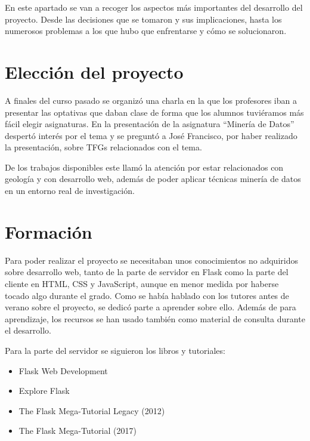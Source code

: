 
En este apartado se van a recoger los aspectos más importantes del desarrollo
del proyecto. Desde las decisiones que se tomaron y sus implicaciones,
hasta los numerosos problemas a los que hubo que enfrentarse y cómo se
solucionaron.

\section{Elección del proyecto}

A finales del curso pasado se organizó una charla en la que los profesores iban
a presentar las optativas que daban clase de forma que los alumnos tuviéramos
más fácil elegir asignaturas. En la presentación de la asignatura ``Minería de
Datos'' despertó interés por el tema y se preguntó a José Francisco, por haber
realizado la presentación, sobre TFGs relacionados con el tema.

De los trabajos disponibles este llamó la atención por estar relacionados con
geología y con desarrollo web, además de poder aplicar técnicas minería de datos
en un entorno real de investigación.

\section{Formación}

Para poder realizar el proyecto se necesitaban unos conocimientos no adquiridos
sobre desarrollo web, tanto de la parte de servidor en Flask como la parte del
cliente en HTML, CSS y JavaScript, aunque en menor medida por haberse tocado
algo durante el grado. Como se había hablado con los tutores antes de verano
sobre el proyecto, se dedicó parte a aprender sobre ello. Además de para
aprendizaje, los recursos se han usado también como material de consulta durante
el desarrollo.

\noindent Para la parte del servidor se siguieron los libros y tutoriales:
\begin{itemize}
	\item Flask Web Development\cite{grinberg2014flask}
	\item Explore Flask\cite{exploreflask}
	\item The Flask Mega-Tutorial Legacy (2012)\cite{grinberg-mega-legacy}
	\item The Flask Mega-Tutorial (2017)\cite{grinberg-mega}
\end{itemize}

